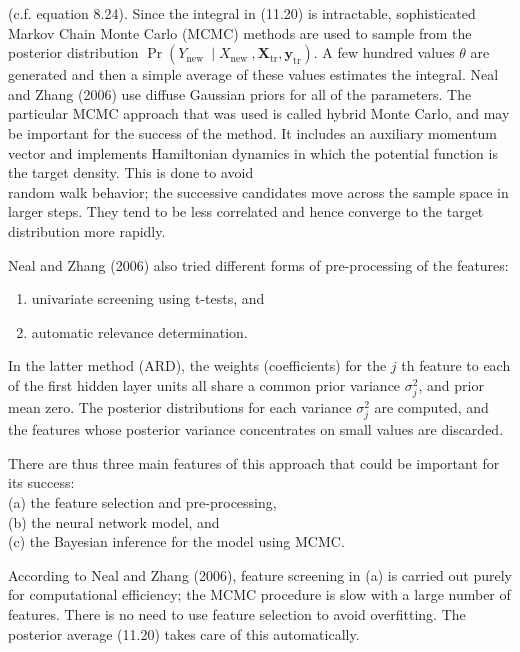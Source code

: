 \documentclass[10pt]{article}
\begin{document}
(c.f. equation 8.24). Since the integral in (11.20) is intractable, sophisticated Markov Chain Monte Carlo (MCMC) methods are used to sample from the posterior distribution $\operatorname{Pr}\left(Y_{\text {new }} \mid X_{\text {new }}, \mathbf{X}_{\mathrm{tr}}, \mathbf{y}_{\mathrm{tr}}\right)$. A few hundred values $\theta$ are generated and then a simple average of these values estimates the integral. Neal and Zhang (2006) use diffuse Gaussian priors for all of the parameters. The particular MCMC approach that was used is called hybrid Monte Carlo, and may be important for the success of the method. It includes an auxiliary momentum vector and implements Hamiltonian dynamics in which the potential function is the target density. This is done to avoid\\
random walk behavior; the successive candidates move across the sample space in larger steps. They tend to be less correlated and hence converge to the target distribution more rapidly.

Neal and Zhang (2006) also tried different forms of pre-processing of the features:

\begin{enumerate}
  \item univariate screening using t-tests, and
  \item automatic relevance determination.
\end{enumerate}

In the latter method (ARD), the weights (coefficients) for the $j$ th feature to each of the first hidden layer units all share a common prior variance $\sigma_{j}^{2}$, and prior mean zero. The posterior distributions for each variance $\sigma_{j}^{2}$ are computed, and the features whose posterior variance concentrates on small values are discarded.

There are thus three main features of this approach that could be important for its success:\\
(a) the feature selection and pre-processing,\\
(b) the neural network model, and\\
(c) the Bayesian inference for the model using MCMC.

According to Neal and Zhang (2006), feature screening in (a) is carried out purely for computational efficiency; the MCMC procedure is slow with a large number of features. There is no need to use feature selection to avoid overfitting. The posterior average (11.20) takes care of this automatically.
\end{document}

